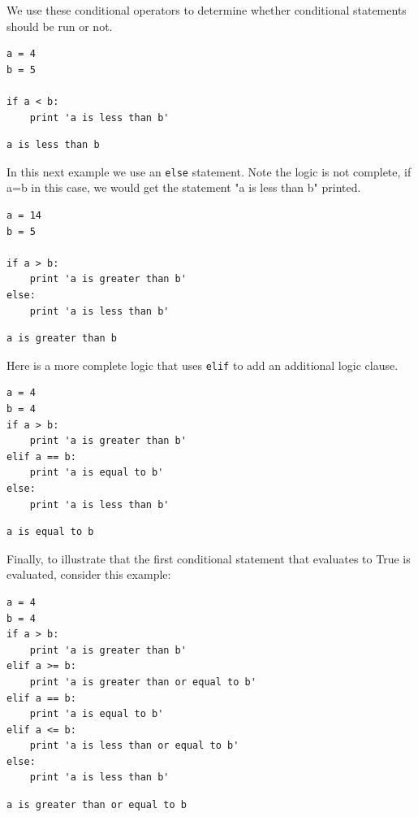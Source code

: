 \documentclass[11pt]{article}
\begin{document}
We use these conditional operators to determine whether conditional statements should be run or not.

\begin{verbatim}
a = 4
b = 5

if a < b:
    print 'a is less than b'
\end{verbatim}

\begin{verbatim}
a is less than b
\end{verbatim}

In this next example we use an \texttt{else} statement. Note the logic is not complete, if a=b in this case, we would get the statement "a is less than b" printed.
\begin{verbatim}
a = 14
b = 5

if a > b:
    print 'a is greater than b'
else:
    print 'a is less than b'
\end{verbatim}

\begin{verbatim}
a is greater than b
\end{verbatim}

Here is a more complete logic that uses \texttt{elif} to add an additional logic clause.
\begin{verbatim}
a = 4
b = 4
if a > b:
    print 'a is greater than b'
elif a == b:
    print 'a is equal to b'
else:
    print 'a is less than b'
\end{verbatim}

\begin{verbatim}
a is equal to b
\end{verbatim}

Finally, to illustrate that the first conditional statement that evaluates to True is evaluated, consider this example:
\begin{verbatim}
a = 4
b = 4
if a > b:
    print 'a is greater than b'
elif a >= b:
    print 'a is greater than or equal to b'
elif a == b:
    print 'a is equal to b'
elif a <= b:
    print 'a is less than or equal to b'
else:
    print 'a is less than b'
\end{verbatim}

\begin{verbatim}
a is greater than or equal to b
\end{verbatim}
\end{document}
